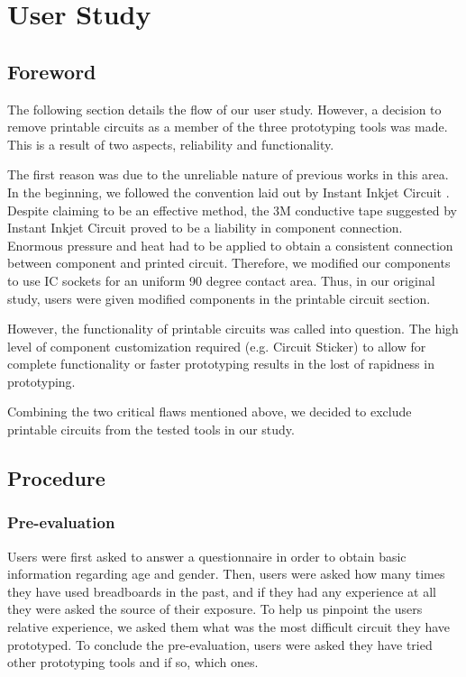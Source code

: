 \section{User Study}

\subsection{Foreword}
The following section details the flow of our user study. However, a decision to remove printable circuits as a member of the three prototyping tools was made. This is a result of two aspects, reliability and functionality. 

The first reason was due to the unreliable nature of previous works in this area. In the beginning, we followed the convention laid out by Instant Inkjet Circuit \cite{Instant_Inkjet_Circuits}. Despite claiming to be an effective method, the 3M conductive tape suggested by Instant Inkjet Circuit proved to be a liability in component connection. Enormous pressure and heat had to be applied to obtain a consistent connection between component and printed circuit. Therefore, we modified our components to use IC sockets for an uniform 90 degree contact area. Thus, in our original study, users were given modified components in the printable circuit section.

However, the functionality of printable circuits was called into question. The high level of component customization required (e.g. Circuit Sticker) to allow for complete functionality or faster prototyping results in the lost of rapidness in prototyping. 


Combining the two critical flaws mentioned above, we decided to exclude printable circuits from the tested tools in our study.

\subsection{Procedure}

\subsubsection{Pre-evaluation}
Users were first asked to answer a questionnaire in order to obtain basic information regarding age and gender. Then, users were asked how many times they have used breadboards in the past, and if they had any experience at all they were asked the source of their exposure. To help us pinpoint the users relative experience, we asked them what was the most difficult circuit they have prototyped. To conclude the pre-evaluation, users were asked they have tried other prototyping tools and if so, which ones.

